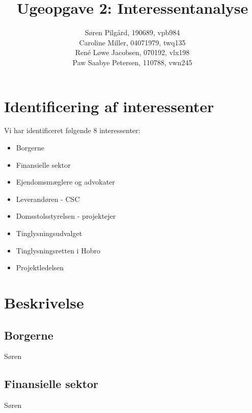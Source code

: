 \documentclass[10pt,a4paper,danish]{article}
\title{Ugeopgave 2: Interessentanalyse}
\author{Søren Pilgård, 190689, vpb984\\
Caroline Miller, 04071979, twq135\\
René Løwe Jacobsen, 070192, vlx198\\
Paw Saabye Petersen, 110788, vwn245}
\begin{document}
\maketitle
\newpage


\section{Identificering af interessenter}





Vi har identificeret følgende 8 interessenter:
\begin{itemize}
\item Borgerne
\item Finansielle sektor
\item Ejendomsmæglere og advokater
\item Leverandøren - CSC
\item Domsstolsstyrelsen - projektejer
\item Tinglysningsudvalget
\item Tinglysningsretten i Hobro
\item Projektledelsen
\end{itemize}

\section{Beskrivelse}
\subsection{Borgerne}
Søren

\subsection{Finansielle sektor}
Søren
\end{document}
